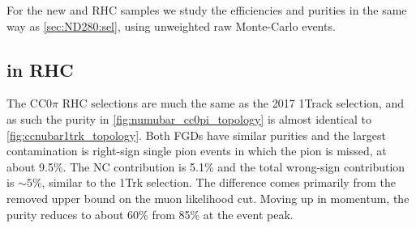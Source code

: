 For the new \numu and \numubar RHC samples we study the efficiencies and purities in the same way as \autoref{sec:ND280:sel}, using unweighted raw Monte-Carlo events.

\subsection{\numubar in RHC}
The CC0$\pi$ RHC selections are much the same as the 2017 1Track selection, and as such the purity in \autoref{fig:numubar_cc0pi_topology} is almost identical to \autoref{fig:ccnubar1trk_topology}. Both FGDs have similar purities and the largest contamination is right-sign single pion events in which the pion is missed, at about 9.5\%. The NC contribution is 5.1\% and the total wrong-sign contribution is $\sim5\%$, similar to the 1Trk selection. The difference comes primarily from the removed upper bound on the muon likelihood cut. Moving up in momentum, the purity reduces to about 60\% from 85\% at the event peak.
